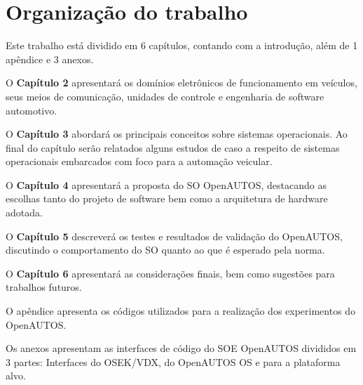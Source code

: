 \section{Organização do trabalho}

Este trabalho está dividido em 6 capítulos, contando com a introdução, além de 1 apêndice e 3 anexos.

O \textbf{Capítulo 2} apresentará os domínios eletrônicos de funcionamento em veículos, seus meios de comunicação, unidades de controle e engenharia de software automotivo.

O \textbf{Capítulo 3} abordará os principais conceitos sobre sistemas operacionais. Ao final do capítulo serão relatados alguns estudos de caso a respeito de sistemas operacionais embarcados com foco para a automação veicular.

O \textbf{Capítulo 4} apresentará a proposta do SO OpenAUTOS, destacando as escolhas tanto do projeto de software bem como a arquitetura de hardware adotada.

O \textbf{Capítulo 5} descreverá os testes e resultados de validação do OpenAUTOS, discutindo o comportamento do SO quanto ao que é esperado pela norma.

O \textbf{Capítulo 6} apresentará as considerações finais, bem como sugestões para trabalhos futuros.

O apêndice apresenta os códigos utilizados para a realização dos experimentos do OpenAUTOS.

Os anexos apresentam as interfaces de código do SOE OpenAUTOS divididos em 3 partes: Interfaces do OSEK/VDX, do OpenAUTOS OS e para a plataforma alvo.
